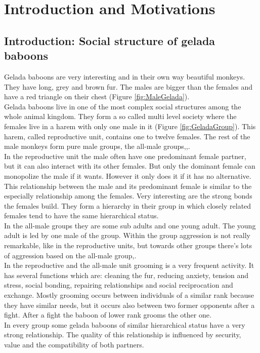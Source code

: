 \documentclass[11pt]{article}
\begin{document}
\section{Introduction and Motivations}
\subsection{Introduction: Social structure of gelada baboons}
\label{sec:Introduction}
Gelada baboons are very interesting and in their own way beautiful monkeys. They have long, grey and brown fur. The males are bigger than the females and have a red triangle on their chest (Figure \ref{fig:MaleGelada}).\\
Gelada baboons live in one of the most complex social structures among the whole animal kingdom. They form a so called multi level society where the females live in a harem with only one male in it (Figure \ref{fig:GeladaGroup}). This harem, called reproductive unit, contains one to twelve females. The rest of the male monkeys form pure male groups, the all-male groups\cite{Dunbar1986},\cite{Crook1966},\cite{Gruter2004}.\\
In the reproductive unit the male often have one predominant female partner, but it can also interact with its other females. But only the dominant female can monopolize the male if it wants. However it only does it if it has no alternative\cite{Dunbar1983}. This relationship between the male and its predominant female is similar to the especially relationship among the females. Very interesting are the  strong bonds the females build\cite{Dunbar1986}. They form a hierarchy in their group in which closely related females tend to have the same hierarchical status\cite{Dunbar1980}.\\
In the all-male groups they are some sub adults and one young adult. The young adult is led by one male of the group\cite{Dunbar1974}. Within the group aggression is not really remarkable, like in the reproductive units, but towards other groups there's lots of aggression based on the all-male group\cite{Dunbar1974},\cite{Dunbar1984}.\\
In the reproductive and the all-male unit grooming is a very frequent activity. It has several functions which are: cleaning the fur, reducing anxiety, tension and stress, social bonding, repairing relationships and social reciprocation and exchange\cite{Puga-Gonzalez2009}. Mostly grooming occurs between individuals of a similar rank because they have similar needs, but it occurs also between two former opponents after a fight\cite{Puga-Gonzalez2009}. After a fight the baboon of lower rank grooms the other one.\\
In every group some gelada baboons of similar hierarchical status have a very strong relationship. The quality of this relationship is influenced by security, value and the compatibility of both partners\cite{Puga-Gonzalez2009}. 
\end{document}
